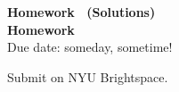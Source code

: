 \begin{center}
\ifsolutions
  \textbf{\Large Homework \hwnumber\ (Solutions)}\\
\else
  \textbf{\Large Homework \hwnumber}\\
\fi
\vspace{12pt}
Due date: someday, sometime! \duedate

Submit on NYU Brightspace.
\end{center}

